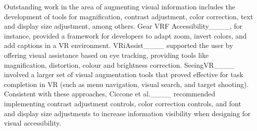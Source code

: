 Outstanding work in the area of augmenting visual information includes the development of tools for magnification, contrast adjustment, color correction, text and display size adjustment, among others. Gear VRF Accessibility____, for instance, provided a framework for developers to adapt zoom, invert colors, and add captions in a VR environment. VRiAssist____ supported the user by offering visual assistance based on eye tracking, providing tools like magnification, distortion, colour and brightness correction. SeeingVR____ involved a larger set of visual augmentation tools that proved effective for task completion in VR (such as menu navigation, visual search, and target shooting).
Consistent with these approaches, Ciccone et al.____ recommended implementing contrast adjustment controls, color correction controls, and font and display size adjustments to increase information visibility when designing for visual accessibility.


